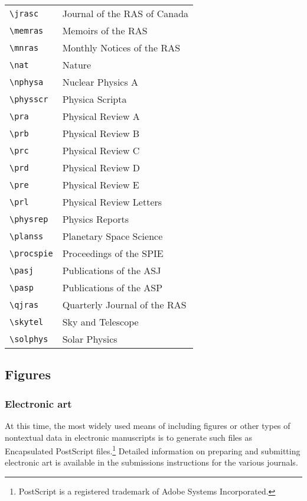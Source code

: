 \documentclass[preprint2]{aastex}
\begin{document}
\begin{table}
\begin{center}
\begin{tabular}{ll}
\verb"\jrasc" & Journal of the RAS of Canada\\ 
\verb"\memras" & Memoirs of the RAS\\ 
\verb"\mnras" & Monthly Notices of the RAS\\ 
\verb"\nat" & Nature\\ 
\verb"\nphysa" & Nuclear Physics A\\ 
\verb"\physscr" & Physica Scripta\\ 
\verb"\pra" & Physical Review A\\ 
\verb"\prb" & Physical Review B\\ 
\verb"\prc" & Physical Review C\\ 
\verb"\prd" & Physical Review D\\ 
\verb"\pre" & Physical Review E\\ 
\verb"\prl" & Physical Review Letters\\ 
\verb"\physrep" & Physics Reports\\ 
\verb"\planss" & Planetary Space Science\\ 
\verb"\procspie" & Proceedings of the SPIE\\ 
\verb"\pasj" & Publications of the ASJ\\ 
\verb"\pasp" & Publications of the ASP\\ 
\verb"\qjras" & Quarterly Journal of the RAS\\ 
\verb"\skytel" & Sky and Telescope\\ 
\verb"\solphys" & Solar Physics\\ 
\end{tabular} 
\end{center} 
\end{table} 
 
\subsection{Figures} 
 
\subsubsection{Electronic art} 
 
At this time, the most widely used means of including figures or other 
types of nontextual data in electronic manuscripts is to generate such 
files as Encapsulated PostScript files.\footnote{%
 PostScript is a registered trademark of Adobe Systems Incorporated.} 
Detailed information on preparing and submitting electronic art is 
available in the submissions instructions for the various journals. 
 
\end{document}
